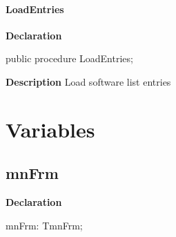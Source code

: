 \documentclass{report}
\newif\ifpdf
\begin{document}
\paragraph*{LoadEntries}\hspace*{\fill}

\label{manager.TmnFrm-LoadEntries}
\begin{list}{}{
\setlength{\itemindent}{0cm}
\setlength{\listparindent}{0cm}
\setlength{\leftmargin}{\evensidemargin}
\addtolength{\leftmargin}{\tmplength}
\settowidth{\labelsep}{X}
\addtolength{\leftmargin}{\labelsep}
\setlength{\labelwidth}{\tmplength}
}
\item[\textbf{Declaration}\hfill]
\ifpdf
\begin{flushleft}
\fi
\begin{ttfamily}
public procedure LoadEntries;\end{ttfamily}

\ifpdf
\end{flushleft}
\fi

\par
\item[\textbf{Description}]
Load software list entries

\end{list}
\section{Variables}
\ifpdf
\subsection*{\large{\textbf{mnFrm}}\normalsize\hspace{1ex}\hrulefill}
\else
\subsection*{mnFrm}
\fi
\label{manager-mnFrm}
\begin{list}{}{
\setlength{\itemindent}{0cm}
\setlength{\listparindent}{0cm}
\setlength{\leftmargin}{\evensidemargin}
\addtolength{\leftmargin}{\tmplength}
\settowidth{\labelsep}{X}
\addtolength{\leftmargin}{\labelsep}
\setlength{\labelwidth}{\tmplength}
}
\item[\textbf{Declaration}\hfill]
\ifpdf
\begin{flushleft}
\fi
\begin{ttfamily}
mnFrm:   TmnFrm;\end{ttfamily}

\ifpdf
\end{flushleft}
\fi

\end{list}
\ifpdf
\end{document}
